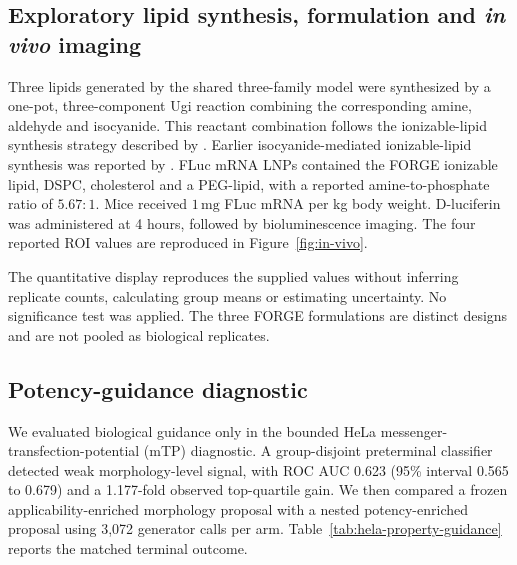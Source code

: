 \documentclass{article}
\theoremstyle{definition}
\newcommand{\ForgePotencyAUC}{0.623}
\newcommand{\ForgePotencyAUCCIHigh}{0.679}
\newcommand{\ForgePotencyAUCCILow}{0.565}
\newcommand{\ForgePotencyAttemptsPerArm}{3{,}072}
\newcommand{\ForgePotencyTopQuartileGain}{1.177}
\begin{document}
\FloatBarrier
\subsection{Exploratory lipid synthesis, formulation and \textnormal{\textit{in vivo}} imaging}
\label{app:in-vivo-methods}

Three lipids generated by the shared three-family model were synthesized by a one-pot,
three-component Ugi reaction combining the corresponding amine, aldehyde and isocyanide. This
reactant combination follows the ionizable-lipid synthesis strategy described by
\citet{chen2023muscle}. Earlier isocyanide-mediated ionizable-lipid synthesis was reported by
\citet{miao2019heterocyclic}.
FLuc mRNA LNPs contained the FORGE ionizable lipid, DSPC, cholesterol and a PEG-lipid, with a
reported amine-to-phosphate ratio of $5.67:1$. Mice received $1\,\mathrm{mg}$ FLuc mRNA per kg
body weight. D-luciferin was administered at 4 hours, followed by bioluminescence imaging.
The four reported ROI values are reproduced in Figure~\ref{fig:in-vivo}.


The quantitative display reproduces the supplied values without inferring replicate counts,
calculating group means or estimating uncertainty. No significance test was applied. The three
FORGE formulations are distinct designs and are not pooled as biological replicates.

\subsection{Potency-guidance diagnostic}
\label{app:guidance-results}

We evaluated biological guidance only in the bounded HeLa messenger-transfection-potential (mTP)
diagnostic. A group-disjoint preterminal classifier detected weak morphology-level signal, with ROC
AUC \ForgePotencyAUC{} (95\% interval \ForgePotencyAUCCILow{} to \ForgePotencyAUCCIHigh) and a
\ForgePotencyTopQuartileGain-fold observed top-quartile gain. We then compared a frozen
applicability-enriched morphology proposal with a nested potency-enriched proposal using
\ForgePotencyAttemptsPerArm{} generator calls per arm. Table~\ref{tab:hela-property-guidance}
reports the matched terminal outcome.
\end{document}
